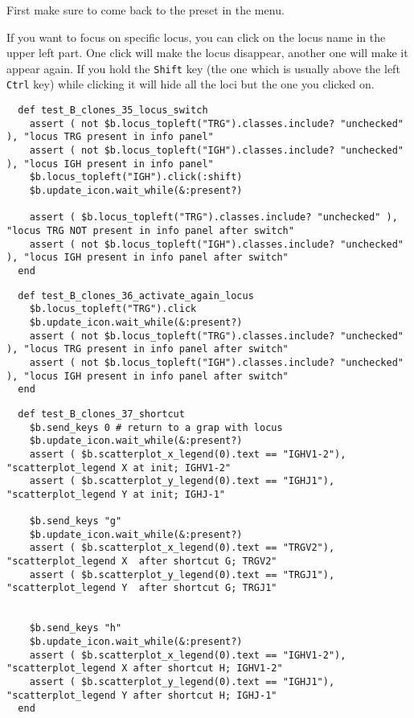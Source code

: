 First make sure to come back to the preset  in the  menu.

If you want to focus on specific locus, you can click on the locus name in
the upper left part. One click will make the locus disappear, another one will
make it appear again.
If you hold the \texttt{Shift} key (the one which is usually above the left
\texttt{Ctrl} key) while clicking it will hide all the loci but the one you
clicked on.

\begin{verbatim}
  def test_B_clones_35_locus_switch
    assert ( not $b.locus_topleft("TRG").classes.include? "unchecked" ), "locus TRG present in info panel"
    assert ( not $b.locus_topleft("IGH").classes.include? "unchecked" ), "locus IGH present in info panel"
    $b.locus_topleft("IGH").click(:shift)
    $b.update_icon.wait_while(&:present?)

    assert ( $b.locus_topleft("TRG").classes.include? "unchecked" ), "locus TRG NOT present in info panel after switch"
    assert ( not $b.locus_topleft("IGH").classes.include? "unchecked" ), "locus IGH present in info panel after switch"
  end
\end{verbatim}

\begin{verbatim}
  def test_B_clones_36_activate_again_locus
    $b.locus_topleft("TRG").click
    $b.update_icon.wait_while(&:present?)
    assert ( not $b.locus_topleft("TRG").classes.include? "unchecked" ), "locus TRG present in info panel after switch"
    assert ( not $b.locus_topleft("IGH").classes.include? "unchecked" ), "locus IGH present in info panel after switch"
  end
\end{verbatim}

\begin{verbatim}
  def test_B_clones_37_shortcut
    $b.send_keys 0 # return to a grap with locus 
    $b.update_icon.wait_while(&:present?)
    assert ( $b.scatterplot_x_legend(0).text == "IGHV1-2"), "scatterplot_legend X at init; IGHV1-2"
    assert ( $b.scatterplot_y_legend(0).text == "IGHJ1"), "scatterplot_legend Y at init; IGHJ-1"

    $b.send_keys "g"
    $b.update_icon.wait_while(&:present?)
    assert ( $b.scatterplot_x_legend(0).text == "TRGV2"), "scatterplot_legend X  after shortcut G; TRGV2"
    assert ( $b.scatterplot_y_legend(0).text == "TRGJ1"), "scatterplot_legend Y  after shortcut G; TRGJ1"
    

    $b.send_keys "h"
    $b.update_icon.wait_while(&:present?)
    assert ( $b.scatterplot_x_legend(0).text == "IGHV1-2"), "scatterplot_legend X after shortcut H; IGHV1-2"
    assert ( $b.scatterplot_y_legend(0).text == "IGHJ1"), "scatterplot_legend Y after shortcut H; IGHJ-1"
  end
\end{verbatim}

